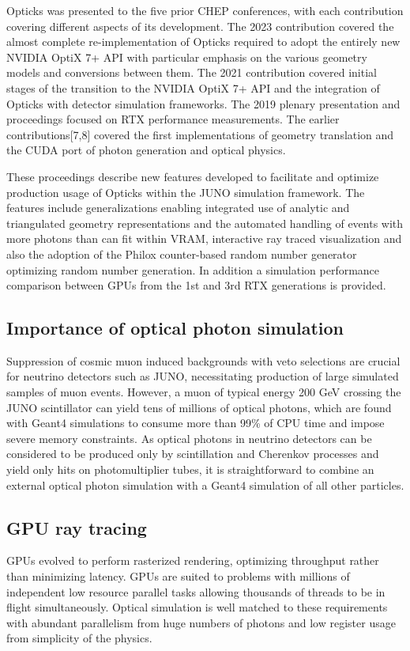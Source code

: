 \documentclass{webofc}
\begin{document}
Opticks was presented to the five prior CHEP conferences, with each contribution
covering different aspects of its development. The 2023 contribution\cite{chep2023} 
covered the almost complete re-implementation of Opticks required to adopt the entirely new NVIDIA OptiX 7+ API
with particular emphasis on the various geometry models and conversions between them.  
%
The 2021 contribution\cite{chep2021} covered initial stages of the transition to the NVIDIA OptiX 7+ API and 
the integration of Opticks with detector simulation frameworks. 
The 2019 plenary presentation and proceedings\cite{chep2019} focused on RTX\cite{rtx} performance measurements.
The earlier contributions[7,8] covered the first 
implementations of geometry translation and the CUDA port of photon generation and optical physics.

These proceedings describe new features developed to facilitate and optimize production usage of Opticks 
within the JUNO simulation framework. The features include generalizations enabling 
integrated use of analytic and triangulated geometry representations and the automated handling of 
events with more photons than can fit within VRAM, interactive ray traced visualization and also the adoption
of the Philox counter-based random number generator optimizing random number generation.
In addition a simulation performance comparison between GPUs from the 1st and 3rd RTX generations
is provided. 
%
%
\subsection{Importance of optical photon simulation}%
%
%
Suppression of cosmic muon induced backgrounds with veto selections are crucial for neutrino
detectors such as JUNO\cite{juno}, necessitating production of large simulated samples of muon events. 
However, a muon of typical energy 200 GeV crossing the JUNO scintillator can yield tens of millions of 
optical photons, which are found with Geant4 simulations to consume more than 99\% of CPU time
and impose severe memory constraints.
%
As optical photons in neutrino detectors can be considered to be produced
only by scintillation and Cherenkov processes and yield only hits
on photomultiplier tubes, it is straightforward to combine an external optical photon simulation 
with a Geant4 simulation of all other particles.
%
\subsection{GPU ray tracing}%
%
GPUs evolved to perform rasterized rendering, optimizing throughput\cite{throughput} rather than minimizing latency.
GPUs are suited to problems with millions of independent low resource parallel tasks allowing thousands of threads 
to be in flight simultaneously.
Optical simulation is well matched to these requirements with abundant parallelism 
from huge numbers of photons and low register usage from simplicity of the physics.
\end{document}
